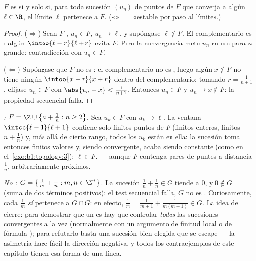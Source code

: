 \begin{theorem}\label{thm:b1:topology:seqclosed}
$F$ es  si y solo si, para toda sucesión $(u_n)$ de puntos de
$F$ que converja a algún $\ell \in \R$, el límite $\ell$ pertenece a
$F$. («» $=$ «estable por paso al límite».)
\end{theorem}

\begin{proof}
($\Rightarrow$) Sean $F$ , $u_n \in F$, $u_n \to \ell$, y
supóngase $\ell \notin F$. El complementario es : algún
$\intoo{\ell - r}{\ell + r}$ evita $F$. Pero la convergencia mete
$u_n$ en ese  para $n$ grande: contradicción con $u_n \in F$.

($\Leftarrow$) Supóngase que $F$ no es : el complementario no es
, luego algún $x \notin F$ no tiene ningún 
$\intoo{x - r}{x + r}$ dentro del complementario; tomando
$r = \frac{1}{n+1}$, elíjase $u_n \in F$ con
$\abs{u_n - x} < \frac{1}{n+1}$. Entonces $u_n \in F$ y
$u_n \to x \notin F$: la propiedad secuencial falla.
\end{proof}

\begin{example}\label{ex:b1:topology:seqtest}
\emph{:} $F = \Z \cup \bigl\{n + \frac1n : n \geq 2\bigr\}$.
Sea $u_k \in F$ con $u_k \to \ell$. La ventana
$\intcc{\ell - 1}{\ell + 1}$ contiene solo finitos puntos de $F$
(finitos enteros, finitos $n + \frac1n$) y, más allá de cierto rango,
todos los $u_k$ están en ella: la sucesión toma entonces finitos
valores y, siendo convergente, acaba siendo constante (como en
el~\cref{exo:b1:topology:3}): $\ell \in F$.  --- aunque $F$
contenga pares de puntos a distancia $\frac1n$, arbitrariamente
próximos.

\emph{No :} $G = \bigl\{\frac1m + \frac1n : m, n \in
\N^*\bigr\}$. La sucesión $\frac1n + \frac1n \in G$ tiende a $0$, y
$0 \notin G$ (suma de dos términos positivos): el test secuencial
falla, $G$ no es . Curiosamente, cada $\frac1m$ \emph{sí}
pertenece a $\overline G \cap G$: en efecto,
$\frac1m = \frac{1}{m+1} + \frac{1}{m(m+1)} \in G$. La idea de cierre:
para demostrar que un  es  hay que controlar
\emph{todas} las sucesiones convergentes a la vez (normalmente con un
argumento de finitud local o de fórmula ); para refutarlo basta
una sucesión bien elegida que se escape --- la asimetría hace fácil la
dirección negativa, y todos los contraejemplos de este capítulo tienen
esa forma de una línea.
\end{example}

